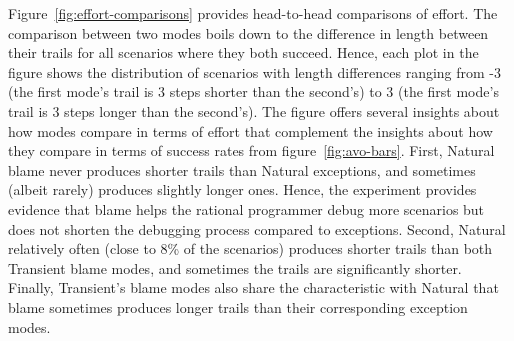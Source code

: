 Figure~\ref{fig:effort-comparisons} provides head-to-head comparisons of effort.
The comparison between two modes boils down to the difference in length between
their trails for all scenarios where they both succeed. Hence, each plot in the
figure shows the distribution of scenarios with length differences ranging from
-3 (the first mode's trail is 3 steps shorter than the second's) to 3 (the first
mode's trail is 3 steps longer than the second's). The figure offers several
insights about how modes compare in terms of effort that complement the insights
about how they compare in terms of success rates from figure~\ref{fig:avo-bars}.
First, Natural blame never produces shorter trails than Natural exceptions, and
sometimes (albeit rarely) produces slightly longer ones. Hence, the experiment
provides evidence that blame helps the rational programmer debug more scenarios
but does not shorten the debugging process compared to exceptions. Second,
Natural relatively often (close to 8\% of the scenarios) produces shorter trails
than both Transient blame modes, and sometimes the trails are significantly
shorter. Finally, Transient's blame modes also share the characteristic with
Natural that blame sometimes produces longer trails than their corresponding
exception modes.

